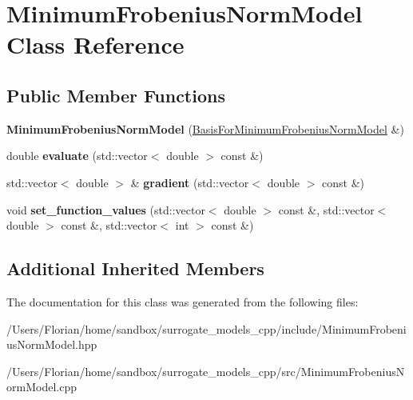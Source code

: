 \hypertarget{class_minimum_frobenius_norm_model}{}\section{Minimum\+Frobenius\+Norm\+Model Class Reference}
\label{class_minimum_frobenius_norm_model}
\subsection*{Public Member Functions}
\begin{DoxyCompactItemize}
\item 
{\bfseries Minimum\+Frobenius\+Norm\+Model} (\hyperlink{class_basis_for_minimum_frobenius_norm_model}{Basis\+For\+Minimum\+Frobenius\+Norm\+Model} \&)\hypertarget{class_minimum_frobenius_norm_model_aa8cbbe0af63820986711db154ac58f11}{}\label{class_minimum_frobenius_norm_model_aa8cbbe0af63820986711db154ac58f11}

\item 
double {\bfseries evaluate} (std\+::vector$<$ double $>$ const \&)\hypertarget{class_minimum_frobenius_norm_model_aa3b876b62deb548d79ab655e30db859d}{}\label{class_minimum_frobenius_norm_model_aa3b876b62deb548d79ab655e30db859d}

\item 
std\+::vector$<$ double $>$ \& {\bfseries gradient} (std\+::vector$<$ double $>$ const \&)\hypertarget{class_minimum_frobenius_norm_model_a6ca20cf106bfbad2befb3920580814e6}{}\label{class_minimum_frobenius_norm_model_a6ca20cf106bfbad2befb3920580814e6}

\item 
void {\bfseries set\+\_\+function\+\_\+values} (std\+::vector$<$ double $>$ const \&, std\+::vector$<$ double $>$ const \&, std\+::vector$<$ int $>$ const \&)\hypertarget{class_minimum_frobenius_norm_model_a20b0ba6c8e39ffa9f8ebda03c360501d}{}\label{class_minimum_frobenius_norm_model_a20b0ba6c8e39ffa9f8ebda03c360501d}

\end{DoxyCompactItemize}
\subsection*{Additional Inherited Members}


The documentation for this class was generated from the following files\+:\begin{DoxyCompactItemize}
\item 
/\+Users/\+Florian/home/sandbox/surrogate\+\_\+models\+\_\+cpp/include/Minimum\+Frobenius\+Norm\+Model.\+hpp\item 
/\+Users/\+Florian/home/sandbox/surrogate\+\_\+models\+\_\+cpp/src/Minimum\+Frobenius\+Norm\+Model.\+cpp\end{DoxyCompactItemize}
